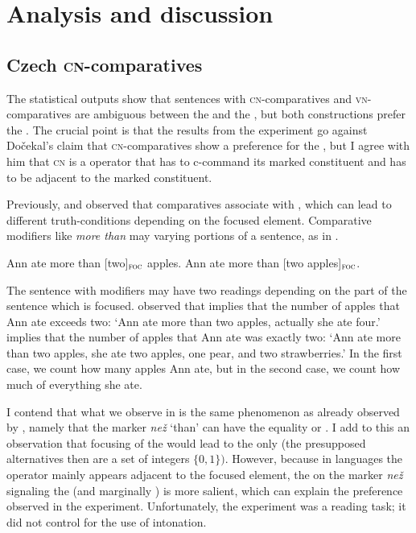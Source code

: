 \documentclass[output=paper, colorlinks, citecolor=brown, newtxmath]{langsci/langscibook}
\begin{document}
\section{Analysis and discussion}

\subsection{Czech \textsc{cn-}comparatives}\label{sect:ccn}

The statistical outputs show that sentences with \textsc{cn-}comparatives and \textsc{vn-}com\-pa\-ra\-tives are ambiguous between the  and the , but both  constructions prefer the . The crucial point is that the results from the experiment go against Dočekal's claim that \textsc{cn-}comparatives show a preference for the , but I agree with him that  \textsc{cn} is a  operator that has to c-command its  marked constituent and has to be adjacent to the  marked constituent.

Previously, \citet{cohen2014superlative} and \citet{geurts2007least} observed that comparatives associate with , which can lead to different truth-conditions depending on the focused element. Comparative modifiers like \textit{more than} may  varying portions of a sentence, as in .

\ea \label{ex:apples}
\ea Ann ate more than [two]$_{\textsc{foc}}$ apples. \label{ex:apples_int}
\ex Ann ate more than [two apples]$_{\textsc{foc}}$. \label{ex:apples_exh}
\z
\z

\noindent The sentence with  modifiers may have two readings depending on the part of the sentence which is focused. \citet{geurts2007least} observed that  implies that the number of apples that Ann ate exceeds two:  `Ann ate more than two apples, actually she ate four.'  implies that the number of apples that Ann ate was exactly two: `Ann ate more than two apples, she ate two apples, one pear, and two strawberries.' In the first case, we count how many apples Ann ate, but in the second case, we count how much of everything she ate.

I contend that what we observe in  is the same phenomenon as already observed by \cite{dovcekal2017upper}, namely that the  marker \textit{než} ‘than’ can have the equality or . I add to this an observation that focusing of the  would lead to the  only (the presupposed alternatives then are a set of integers $\{0,1\})$. However, because in  languages the  operator mainly appears adjacent to the focused element, the  on the  marker \textit{než} signaling the  (and marginally ) is more salient, which can explain the preference observed in the experiment. Unfortunately, the experiment was a reading task; it did not control for the use of intonation.
\end{document}
